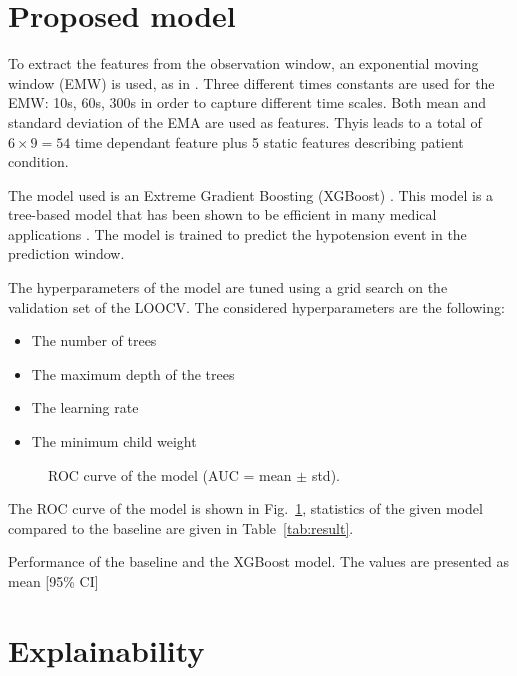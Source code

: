 \documentclass[a4paper,12pt]{article}
\begin{document}
\section{Proposed model}

To extract the features from the observation window, an exponential moving window (EMW) is used, as in \cite{lundbergExplainableMachinelearningPredictions2018}. Three different times constants are used for the EMW: 10s, 60s, 300s in order to capture different time scales. Both mean and standard deviation of the EMA are used as features. Thyis leads to a total of $6 \times 9 = 54$ time dependant feature plus 5 static features describing patient condition. \medskip

The model used is an Extreme Gradient Boosting (XGBoost) \cite{chenXGBoostScalableTree2016}. This model is a tree-based model that has been shown to be efficient in many medical applications \cite{chenXGBoostScalableTree2016}. The model is trained to predict the hypotension event in the prediction window. \medskip

The hyperparameters of the model are tuned using a grid search on the validation set of the LOOCV. The considered hyperparameters are the following:
\begin{itemize}
    \item The number of trees
    \item The maximum depth of the trees
    \item The learning rate
    \item The minimum child weight
\end{itemize}

\begin{figure}[h]
    \centering
    
    \caption{ROC curve of the model (AUC = mean $\pm$ std).}
    \label{fig:roc}
\end{figure}

The ROC curve of the model is shown in Fig.~\ref{fig:roc}, statistics of the given model compared to the baseline are given in Table~\ref{tab:result}.

\begin{table}
    \centering
    \scriptsize
    
    \caption{Performance of the baseline and the XGBoost model. The values are presented as mean [95\% CI]}
    \label{tab:result}
\end{table}

\section{Explainability}
\end{document}
